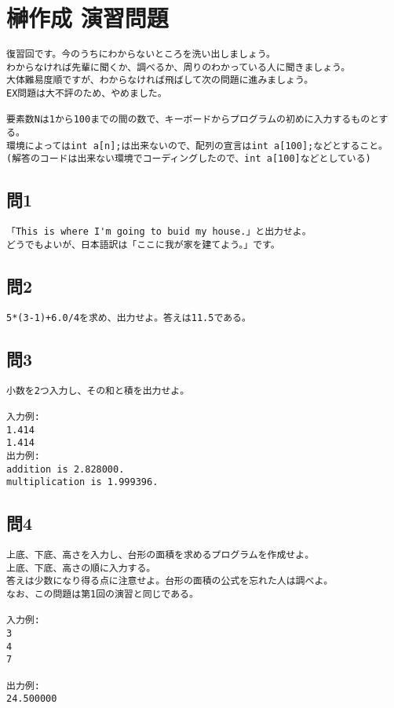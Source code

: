 \section{榊作成 演習問題}
\begin{verbatim}
復習回です。今のうちにわからないところを洗い出しましょう。
わからなければ先輩に聞くか、調べるか、周りのわかっている人に聞きましょう。
大体難易度順ですが、わからなければ飛ばして次の問題に進みましょう。
EX問題は大不評のため、やめました。

要素数Nは1から100までの間の数で、キーボードからプログラムの初めに入力するものとする。
環境によってはint a[n];は出来ないので、配列の宣言はint a[100];などとすること。
(解答のコードは出来ない環境でコーディングしたので、int a[100]などとしている)
\end{verbatim}

\subsection{問1}
\begin{verbatim}
「This is where I'm going to buid my house.」と出力せよ。
どうでもよいが、日本語訳は「ここに我が家を建てよう。」です。
\end{verbatim}

\subsection{問2}
\begin{verbatim}
5*(3-1)+6.0/4を求め、出力せよ。答えは11.5である。
\end{verbatim}

\subsection{問3}
\begin{verbatim}
小数を2つ入力し、その和と積を出力せよ。

入力例:
1.414
1.414
出力例:
addition is 2.828000.
multiplication is 1.999396.
\end{verbatim}

\subsection{問4}
\begin{verbatim}
上底、下底、高さを入力し、台形の面積を求めるプログラムを作成せよ。
上底、下底、高さの順に入力する。
答えは少数になり得る点に注意せよ。台形の面積の公式を忘れた人は調べよ。
なお、この問題は第1回の演習と同じである。

入力例:
3
4
7

出力例:
24.500000
\end{verbatim}

